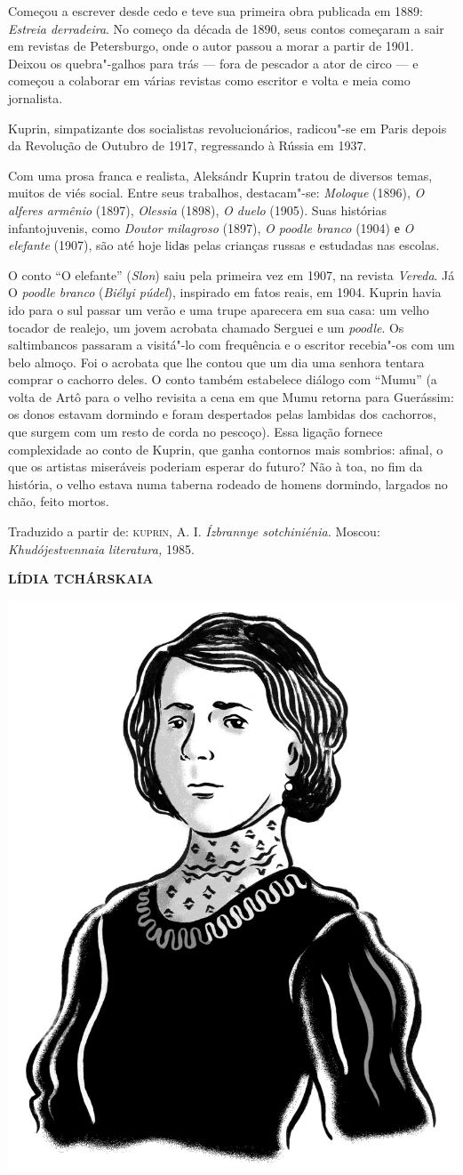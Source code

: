 Começou a escrever desde cedo e teve sua primeira obra publicada em
1889: \emph{Estreia derradeira}. No começo da década de 1890, seus
contos começaram a sair em revistas de Petersburgo, onde o autor passou
a morar a partir de 1901. Deixou os quebra"-galhos para trás --- fora de pescador
a ator de circo --- e começou a colaborar em várias revistas como
escritor e volta e meia como jornalista.

Kuprin, simpatizante dos socialistas revolucionários, radicou"-se em
Paris depois da Revolução de Outubro de 1917, regressando à Rússia em
1937.

Com uma prosa franca e realista, Aleksándr Kuprin tratou de diversos
temas, muitos de viés social. Entre seus trabalhos, destacam"-se:
\emph{Moloque} (1896), \emph{O alferes armênio} (1897), \emph{Olessia}
(1898), \emph{O duelo} (1905). Suas histórias infantojuvenis, como
\emph{Doutor milagroso} (1897), \emph{O poodle branco} (1904) е \emph{O
elefante} (1907), são até hoje lidаs pelas crianças russas e estudadas
nas escolas.

O conto ``O elefante'' (\emph{Slon}) saiu pela primeira vez em 1907,
na revista \emph{Vereda}. Já O \emph{poodle branco} (\emph{Biélyi
púdel}), inspirado em fatos reais, em 1904. Kuprin havia ido para o sul
passar um verão e uma trupe aparecera em sua casa: um velho tocador de
realejo, um jovem acrobata chamado Serguei e um \emph{poodle}. Os
saltimbancos passaram a visitá"-lo com frequência e o escritor recebia"-os
com um belo almoço. Foi o acrobata que lhe contou que um dia uma senhora
tentara comprar o cachorro deles. O conto também estabelece diálogo com
``Mumu'' (a volta de Artô para o velho revisita a cena em que Mumu
retorna para Guerássim: os donos estavam dormindo e foram despertados
pelas lambidas dos cachorros, que surgem com um resto de corda no
pescoço). Essa ligação fornece complexidade ao conto de Kuprin, que
ganha contornos mais sombrios: afinal, o que os artistas miseráveis
poderiam esperar do futuro? Não à toa, no fim da história, o velho
estava numa taberna rodeado de homens dormindo, largados no chão, feito mortos.

Traduzido a partir de:
\textsc{kuprin}, A. I. \emph{Ízbrannye sotchiniénia.} Moscou:
\emph{Khudójestvennaia literatura,} 1985.

\bigskip
\noindent\textbf{LÍDIA TCHÁRSKAIA}\medskip

\noindent\includegraphics[width=.8in]{./imgs/autor10.jpg}

